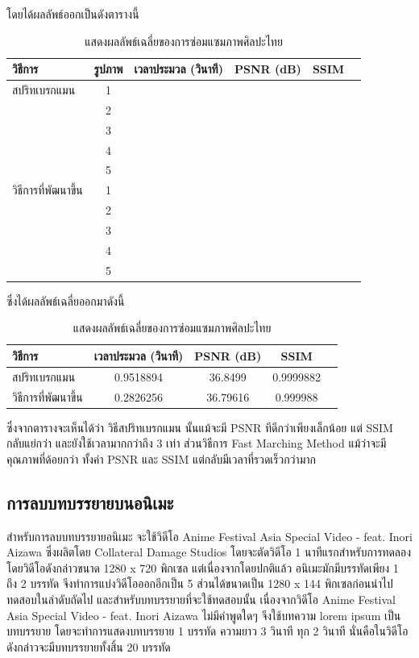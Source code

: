\documentclass[hidelinks, a4paper,12pt]{article}
\numberwithin{equation}{section}							%
\numberwithin{equation}{section}
\begin{document}
{	 \hspace{1cm} โดยได้ผลลัพธ์ออกเป็นดังตารางนี้
	\begin{table}[H]
		\centering
		\begin{tabular}[ht]{|l|c|c|c|c|c|}
			\hline
			วิธีการ  & รูปภาพ &เวลาประมวล  (วินาที) & PSNR (dB) & SSIM \\
			\hline
			สปริทเบรกแมน & 1 &  &  & \\ 
			 & 2 &  &  & \\
			 & 3 &  &  & \\
			 & 4 &  &  & \\
			 & 5 &  &  & \\
			 \hline
			วิธีการที่พัฒนาขึ้น & 1 &  & & \\
			 & 2 &  & & \\
			 & 3 &  & & \\
			 & 4 &  & & \\
			 & 5 &  & & \\
			\hline
		\end{tabular}
		\caption{แสดงผลลัพธ์เฉลี่ยของการซ่อมแซมภาพศิลปะไทย}
	\end{table}	
	ซึ่งได้ผลลัพธ์เฉลี่ยออกมาดังนี้
	\begin{table}[H]
		\centering
		\begin{tabular}[ht]{|l|c|c|c|c|}
			\hline
			วิธีการ  & เวลาประมวล  (วินาที) & PSNR (dB) & SSIM \\
			\hline
			สปริทเบรกแมน & 0.9518894 & 36.8499 & 0.9999882 \\ 
			วิธีการที่พัฒนาขึ้น & 0.2826256 & 36.79616 & 0.999988 \\
			\hline
		\end{tabular}
		\caption{แสดงผลลัพธ์เฉลี่ยของการซ่อมแซมภาพศิลปะไทย}
	\end{table}	
	\hspace{1cm} ซึ่งจากตารางจะเห็นได้ว่า วิธีสปริทเบรกแมน นั้นแม้จะมี PSNR ทีดีกว่าเพียงเล็กน้อย แต่ SSIM กลับแย่กว่า และยังใช้เวลามากกว่าถึง 3 เท่า ส่วนวิธีการ Fast Marching Method แม้ว่าจะมีคุณภาพที่ด้อยกว่า ทั้งค่า PSNR และ SSIM แต่กลับมีเวลาที่รวดเร็วกว่ามาก
	
	
	
	\subsection{การลบบทบรรยายบนอนิเมะ}
	\hspace{1cm} สำหรับการลบบทบรรยายอนิเมะ จะใช้วิดีโอ Anime Festival Asia Special Video - feat. Inori Aizawa ซึ่งผลิตโดย Collateral Damage Studios โดยจะตัดวิดีโอ 1 นาทีแรกสำหรับการทดลอง โดยวิดีโอดังกล่าวขนาด 1280 x 720 พิกเซล แต่เนื่องจากโดยปกติแล้ว อนิเมะมักมีบรรทัดเพียง 1 ถึง 2 บรรทัด จึงทำการแบ่งวิดีโอออกอีกเป็น 5 ส่วนได้ขนาดเป็น 1280 x 144 พิกเซลก่อนนำไปทดสอบในลำดับถัดไป
	\hspace{1cm} และสำหรับบทบรรยายที่จะใช้ทดสอบนั้น เนื่องจากวิดีโอ Anime Festival Asia Special Video - feat. Inori Aizawa ไม่มีคำพูดใดๆ จึงใช้บทความ lorem ipsum เป็นบทบรรยาย โดยจะทำการแสดงบทบรรยาย 1 บรรทัด ความยาว 3 วินาที ทุก 2 วินาที นั่นคือในวิดีโอดังกล่าวจะมีบทบรรยายทั้งสิ้น 20 บรรทัด	
	
}
\end{document}
